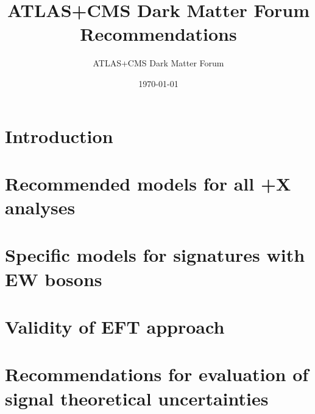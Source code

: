 \documentclass[a4paper,debug,notitlepage,nobib]{tufte-book}
\title{ATLAS+CMS Dark Matter Forum Recommendations}
\author{ATLAS+CMS Dark Matter Forum}
\date{\today}
\begin{document}
\morefloats
\setcounter{secnumdepth}{3} %



\setcounter{tocdepth}{3}
\tableofcontents
 
\pagebreak

\chapter{Introduction}
\label{sec:Introduction}



\chapter{Recommended models for all \MET+X analyses}
\label{subsec:MonojetLikeModels}


%

\chapter{Specific models for signatures with EW bosons}
\label{subsec:EWSpecificModels}



\chapter{Validity of EFT approach}
\label{sec:EFTValidity} 


 \chapter{Recommendations for evaluation of signal theoretical uncertainties}
 \label{sec:TheoryUncertainties} 
 



\appendix

%
\end{document}
